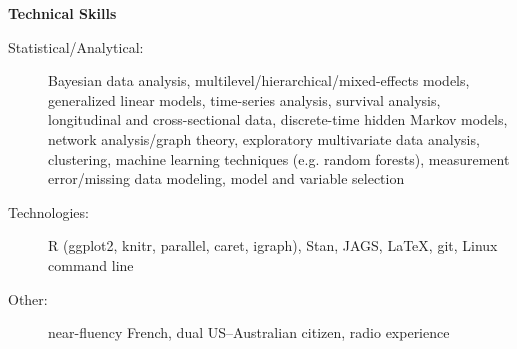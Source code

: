 \documentclass[letterpaper,11pt]{article}
\newcommand{\resheading}[1]{{\large \colorbox{mygrey}{\begin{minipage}{\textwidth}{\textbf{#1 \vphantom{p\^{E}}}}\end{minipage}}}}
\begin{document}

%

\vspace{0.25in}
\resheading{Technical Skills}
	\begin{description}
    \item[Statistical/Analytical:] { \footnotesize Bayesian data analysis, multilevel/hierarchical/mixed-effects models, generalized linear models, time-series analysis, survival analysis, longitudinal and cross-sectional data, discrete-time hidden Markov models, network analysis/graph theory, exploratory multivariate data analysis, clustering, machine learning techniques (e.g. random forests), measurement error/missing data modeling, model and variable selection }
    \item[Technologies:] { \footnotesize R (ggplot2, knitr, parallel, caret, igraph), Stan, JAGS, \LaTeX, git, Linux command line }
    \item[Other:] { \footnotesize near-fluency French, dual US--Australian citizen, radio experience }
	\end{description} %
\vspace{0.25in}

\end{document}
